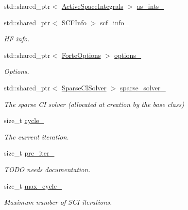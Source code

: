 \begin{DoxyCompactItemize}
std\+::shared\+\_\+ptr$<$ \mbox{\hyperlink{classforte_1_1_active_space_integrals}{Active\+Space\+Integrals}} $>$ \mbox{\hyperlink{classforte_1_1_selected_c_i_method_a23a19662f1d8f1c33dbf0892991ece79}{as\+\_\+ints\+\_\+}}
\item 
std\+::shared\+\_\+ptr$<$ \mbox{\hyperlink{classforte_1_1_s_c_f_info}{S\+C\+F\+Info}} $>$ \mbox{\hyperlink{classforte_1_1_selected_c_i_method_a46ffcf10ed7833a84fd25695ed0c00ac}{scf\+\_\+info\+\_\+}}
\begin{DoxyCompactList}\small\item\em HF info. \end{DoxyCompactList}\item 
std\+::shared\+\_\+ptr$<$ \mbox{\hyperlink{classforte_1_1_forte_options}{Forte\+Options}} $>$ \mbox{\hyperlink{classforte_1_1_selected_c_i_method_afbec52cfc1804bf6d3b7b07eb8027319}{options\+\_\+}}
\begin{DoxyCompactList}\small\item\em Options. \end{DoxyCompactList}\item 
std\+::shared\+\_\+ptr$<$ \mbox{\hyperlink{classforte_1_1_sparse_c_i_solver}{Sparse\+C\+I\+Solver}} $>$ \mbox{\hyperlink{classforte_1_1_selected_c_i_method_a44c63ccf7191ed1dfc12a53359f769ec}{sparse\+\_\+solver\+\_\+}}
\begin{DoxyCompactList}\small\item\em The sparse CI solver (allocated at creation by the base class) \end{DoxyCompactList}\item 
size\+\_\+t \mbox{\hyperlink{classforte_1_1_selected_c_i_method_a632d688ee6400114b366e1057fbd8691}{cycle\+\_\+}}
\begin{DoxyCompactList}\small\item\em The current iteration. \end{DoxyCompactList}\item 
size\+\_\+t \mbox{\hyperlink{classforte_1_1_selected_c_i_method_a79a948c45618ba2241163cc82eb2761d}{pre\+\_\+iter\+\_\+}}
\begin{DoxyCompactList}\small\item\em T\+O\+DO needs documentation. \end{DoxyCompactList}\item 
size\+\_\+t \mbox{\hyperlink{classforte_1_1_selected_c_i_method_a8a2a37815105a5c4e17e540140c9cacf}{max\+\_\+cycle\+\_\+}}
\begin{DoxyCompactList}\small\item\em Maximum number of S\+CI iterations. \end{DoxyCompactList}\item 

\end{DoxyCompactItemize}
